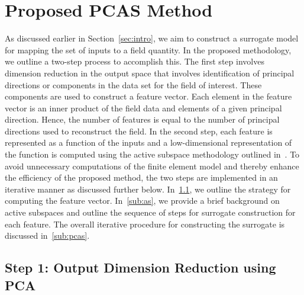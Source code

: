 \section{Proposed PCAS Method}
\label{sec:method}

As discussed earlier in Section~\ref{sec:intro}, we aim to construct a surrogate model for mapping the set of inputs to a
field quantity. In the proposed methodology, we outline a two-step process to accomplish this. The first step involves
dimension reduction in the output space that involves
identification of principal directions or components in the data set for the field of interest. These components are used
to construct a feature vector. Each element in the feature vector is an inner product of the field data and elements
of a given principal direction. Hence, the number of features is equal to the number of principal directions used to
reconstruct the field. In the second step, each feature is represented as a function of the inputs and a low-dimensional
representation of the function is computed
using the active subspace methodology outlined in~\cite{Constantine:2015}. 
To avoid unnecessary computations of the finite element model and thereby enhance the efficiency of the proposed method,
the two steps are implemented in an iterative manner as discussed further below. 
In~\ref{sub:pca}, we outline
the strategy for computing the feature vector. In~\ref{sub:as}, we provide a brief background on active subspaces
and outline the sequence of steps for surrogate construction for each feature. The overall iterative procedure for
constructing the surrogate is discussed in~\ref{sub:pcas}.

\subsection{Step 1: Output Dimension Reduction using PCA}
\label{sub:pca}

